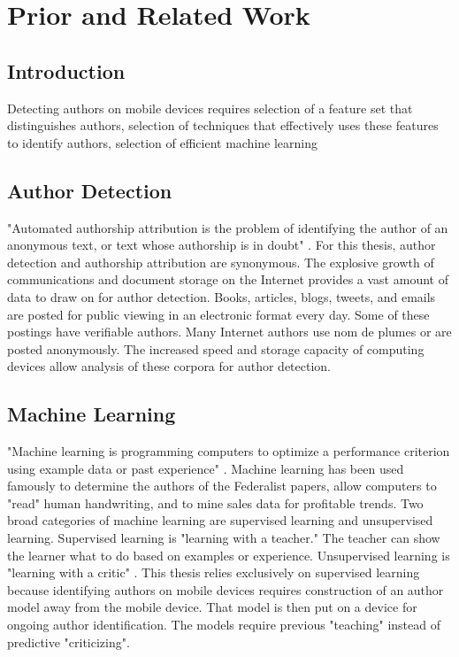 \chapter {Prior and Related Work}

\section {Introduction}
Detecting authors on mobile devices requires selection of a feature set that distinguishes authors, selection of techniques that effectively uses these features to identify authors, selection of efficient machine learning

\section {Author Detection}
"Automated authorship attribution is the problem of identifying the author of an anonymous text, or text whose authorship is in doubt" \cite{love_attributing_2002}.  For this thesis, author detection and authorship attribution are synonymous.  The explosive growth of communications and document storage on the Internet provides a vast amount of data to draw on for author detection.  Books, articles, blogs, tweets, and emails are posted for public viewing in an electronic format every day.  Some of these postings have verifiable authors.  Many Internet authors use nom de plumes or are posted anonymously.  The increased speed and storage capacity of computing devices allow analysis of these corpora for author detection.

\section {Machine Learning}
"Machine learning is programming computers to optimize a performance criterion using example data or past experience" \cite{alpaydin_introduction_2004}.  Machine learning has been used famously to determine the authors of the Federalist papers, allow computers to "read" human handwriting, and to mine sales data for profitable trends.  Two broad categories of machine learning are supervised learning and unsupervised learning.  Supervised learning is "learning with a teacher."  The teacher can show the learner what to do based on examples or experience. Unsupervised learning is "learning with a critic" \cite{alpaydin_introduction_2004}. This thesis relies exclusively on supervised learning because identifying authors on mobile devices requires construction of an author model away from the mobile device.  That model is then put on a device for ongoing author identification.  The models require previous "teaching" instead of predictive "criticizing".

